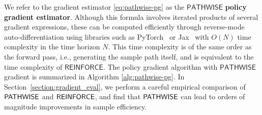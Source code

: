 
We refer to the gradient estimator \eqref{eq:pathwise-pg} as the $\mathsf{PATHWISE}$ {\bf policy gradient estimator}. Although this formula involves iterated products of several gradient expressions, these can be computed efficiently through reverse-mode auto-differentiation using libraries such as PyTorch~\cite{PaszkeGrChChYaDeLiDeAnLe17} or Jax~\cite{jax2018github} with $O(N)$ time complexity in the time horizon $N$. This time complexity is of the same order as the forward pass, i.e., generating the sample path itself, and is equivalent to the time complexity of $\mathsf{REINFORCE}$. The policy gradient algorithm with $\mathsf{PATHWISE}$ gradient is summarized in Algorithm \ref{alg:pathwise-pg}. In Section~\ref{section:gradient_eval}, we perform a careful empirical comparison of $\mathsf{PATHWISE}$ and $\mathsf{REINFORCE}$, and find that $\mathsf{PATHWISE}$ can lead to orders of magnitude improvements in sample efficiency. 

